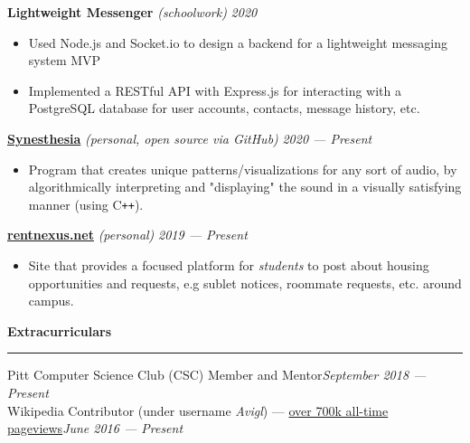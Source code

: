 \documentclass[10pt]{article}
\begin{document}
\begin{flushleft}
\begin{itemize}
		\end{itemize}
		\vspace{-1.5mm}
		\textbf{Lightweight Messenger} \textit{(schoolwork)} \hfill \textit{\small 2020}
		\vspace{-2mm}
		\begin{itemize}
			\item Used Node.js and Socket.io to design a backend for a lightweight messaging system MVP
			\vspace{-2mm}
			\item Implemented a RESTful API with Express.js for interacting with a PostgreSQL database for user accounts, contacts, message history, etc.
		\end{itemize}
		\vspace{-1.5mm}
		\textbf{\href{https://github.com/avigloz/synesthesia}{Synesthesia}} \textit{(personal, open source via GitHub)} \hfill \textit{\small 2020 --- Present}
		\vspace{-2mm}
		\begin{itemize}
			\item Program that creates unique patterns/visualizations for any sort of audio, by algorithmically interpreting and "displaying" the sound in a visually satisfying manner (using C\texttt{++}).
		\end{itemize}
		\vspace{-1.5mm}
		\textbf{\href{https://rentnexus.net}{rentnexus.net}} \textit{(personal)} \hfill \textit{\small 2019 --- Present}
		\vspace{-2mm}
		\begin{itemize}
			\item Site that provides a focused platform for \textit{students} to post about housing opportunities and requests, e.g sublet notices, roommate requests, etc. around campus.
		\end{itemize}

		\vspace{1.5mm}
		{\large \raggedright \textbf{Extracurriculars}}
		\vspace{1.25mm}
	
		\hrule
	
		\vspace{2.25mm}
		Pitt Computer Science Club (CSC) Member and Mentor\hfill \textit{\small September 2018 --- Present}\\
		Wikipedia Contributor (under username \textit{Avigl}) --- \href{https://pageviews.toolforge.org/?project=en.wikipedia.org&platform=all-access&agent=user&redirects=0&range=all-time&pages=Timeline_of_social_media|Timeline_of_online_advertising|Timeline_of_e-commerce|Screening_Partnership_Program|Silicon_Valley_Education_Foundation|Chicago_Community_Trust}{over 700k all-time pageviews}\hfill \textit{\small June 2016 --- Present}
		
	\end{flushleft}
\end{document}

